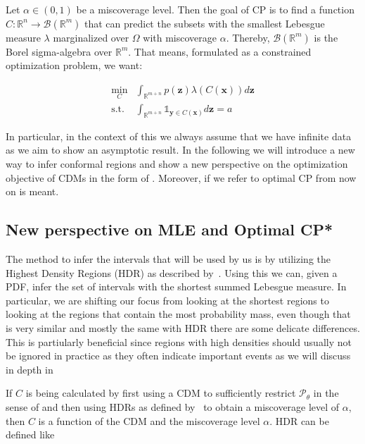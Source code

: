 Let $\alpha \in (0,1)$ be a miscoverage level. Then the goal of CP is to find a function $C : \mathbb{R}^n \to \mathcal{B}(\mathbb{R}^m)$ that can predict the subsets with the smallest Lebesgue measure $\lambda$ marginalized over $\Omega$ with miscoverage $\alpha$. Thereby, $\mathcal{B}(\mathbb{R}^m)$ is the Borel sigma-algebra over $\mathbb{R}^m$. That means, formulated as a constrained optimization problem, we want:



\begin{align}
    \min_C & \int_{\mathbb{R}^{m+n}} p(\mathbf{z})
    \lambda(C(\mathbf{x}))
    d\mathbf{z} \label{eq:optimal_cp_def_func}
    \\
    \text{s.t.} & \int_{\mathbb{R}^{m+n}} \mathds{1}_{\mathbf{y} \in
    C(\mathbf{x})} d\mathbf{z} = a
\end{align}


In particular, in the context of this  we always assume that we have infinite data as we aim to show an asymptotic result. In the following  we will introduce a new way to infer conformal regions and show a new perspective on the optimization objective of CDMs in the form of . Moreover, if we refer to optimal CP from now on  is meant.

\subsection{New perspective on MLE and Optimal CP*}\label{sec:optimal_cp_proves}

The method to infer the intervals that will be used by us is by utilizing the Highest Density Regions (HDR) as described by~\cite{hyndman1996computing}. Using this we can, given a PDF, infer the set of intervals with the shortest summed Lebesgue measure. In particular, we are shifting our focus from looking at the shortest regions to looking at the regions that contain the most probability mass, even though that is very similar and mostly the same with HDR there are some delicate differences. This is partiularly beneficial since regions with high densities should usually not be ignored in practice as they often indicate important events as we will discuss in depth in 

If $C$ is being calculated by first using a CDM to sufficiently restrict $\mathscr{P}_\theta$ in the sense of  and then using HDRs as defined by~\cite{hyndman1996computing} to obtain a miscoverage level of $\alpha$, then $C$ is a function of the CDM and the miscoverage level $\alpha$. HDR can be defined like

